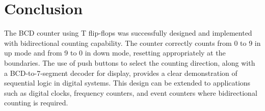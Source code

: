 \documentclass[12pt]{article}
\begin{document}
\section*{Conclusion}
The BCD counter using T flip-flops was successfully designed and implemented with bidirectional counting capability. The counter correctly counts from 0 to 9 in up mode and from 9 to 0 in down mode, resetting appropriately at the boundaries. The use of push buttons to select the counting direction, along with a BCD-to-7-segment decoder for display, provides a clear demonstration of sequential logic in digital systems. This design can be extended to applications such as digital clocks, frequency counters, and event counters where bidirectional counting is required.
\end{document}
